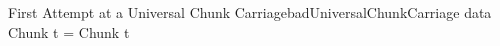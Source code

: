 \begin{pseudohaskell}{First Attempt at a Universal Chunk Carriage}{badUniversalChunkCarriage}
data Chunk t = Chunk t
\end{pseudohaskell}

